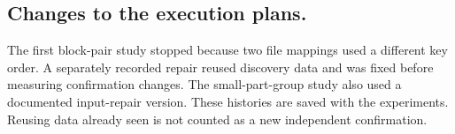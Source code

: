 \documentclass[11pt,letterpaper]{article}
\begin{document}
\subsection*{Changes to the execution plans.}
The first block-pair study stopped because two file mappings used a different
key order. A separately recorded repair reused discovery data and was fixed
before measuring confirmation changes. The small-part-group study also used a
documented input-repair version. These histories are saved with the experiments.
Reusing data already seen is not counted as a new independent confirmation.
\end{document}
